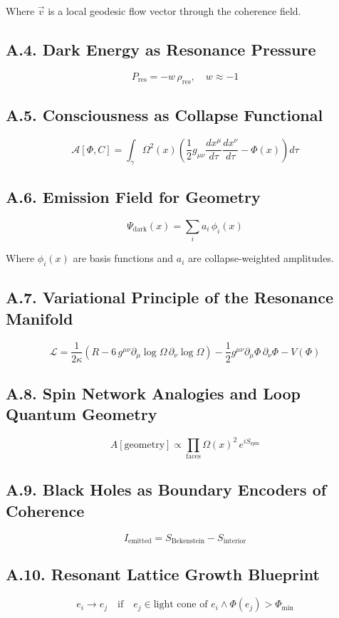 Where \( \vec{v} \) is a local geodesic flow vector through the coherence field.

\subsection*{A.4. Dark Energy as Resonance Pressure}
\[
P_{\text{res}} = -w\, \rho_{\text{res}}, \quad w \approx -1
\]

\subsection*{A.5. Consciousness as Collapse Functional}
\[
\mathcal{A}[\Phi, C] = \int_{\gamma} \Omega^2(x) \left( \frac{1}{2} g_{\mu\nu} \frac{dx^\mu}{d\tau} \frac{dx^\nu}{d\tau} - \Phi(x) \right) d\tau
\]

\subsection*{A.6. Emission Field for Geometry}
\[
\Psi_{\text{dark}}(x) = \sum_i a_i\, \phi_i(x)
\]

Where \( \phi_i(x) \) are basis functions and \( a_i \) are collapse-weighted amplitudes.

\subsection*{A.7. Variational Principle of the Resonance Manifold}
\[
\mathcal{L} = \frac{1}{2\kappa} \left( R - 6\, g^{\mu\nu} \partial_\mu \log \Omega\, \partial_\nu \log \Omega \right) - \frac{1}{2} g^{\mu\nu} \partial_\mu \Phi\, \partial_\nu \Phi - V(\Phi)
\]

\subsection*{A.8. Spin Network Analogies and Loop Quantum Geometry}
\[
A[\text{geometry}] \propto \prod_{\text{faces}} \Omega(x)^2\, e^{i S_{\text{spin}}}
\]

\subsection*{A.9. Black Holes as Boundary Encoders of Coherence}
\[
I_{\text{emitted}} = S_{\text{Bekenstein}} - S_{\text{interior}}
\]

\subsection*{A.10. Resonant Lattice Growth Blueprint}
\[
e_i \rightarrow e_j \quad \text{if} \quad e_j \in \text{light cone of } e_i \land \Phi(e_j) > \Phi_{\text{min}}
\]

